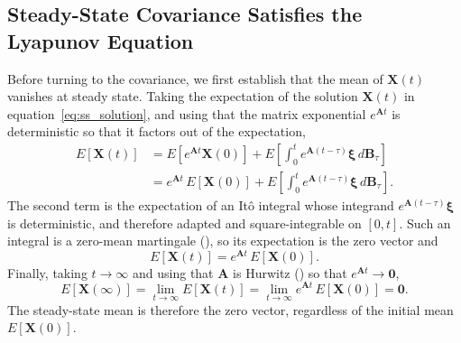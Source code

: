 \documentclass{article}
\begin{document}
\subsection*{Steady-State Covariance Satisfies the Lyapunov Equation}
Before turning to the covariance, we first establish that the mean of
$\mathbf{X}(t)$ vanishes at steady state. Taking the expectation of the solution
$\mathbf{X}(t)$ in equation~\ref{eq:ss_solution}, and using that the matrix
exponential $e^{\mathbf{A}t}$ is deterministic so that it factors out of the
expectation,
\begin{equation}
\begin{aligned}
E[\mathbf{X}(t)]
&= E\left[ e^{\mathbf{A}t}\mathbf{X}(0) \right] + E\left[ \int_0^t e^{\mathbf{A}(t-\tau)} \boldsymbol{\xi}\, d\mathbf{B}_\tau \right] \\
&= e^{\mathbf{A}t}\, E[\mathbf{X}(0)] + E\left[ \int_0^t e^{\mathbf{A}(t-\tau)} \boldsymbol{\xi}\, d\mathbf{B}_\tau \right] .
\end{aligned}
\label{eq:ss_mean_t_0}
\end{equation}
The second term is the expectation of an It\^{o} integral whose integrand
$e^{\mathbf{A}(t-\tau)}\boldsymbol{\xi}$ is deterministic, and therefore adapted and
square-integrable on $[0,t]$. Such an integral is a zero-mean martingale
(\citealp[\S3.2]{Pavliotis2014}), so its
expectation is the zero vector and
\begin{equation}
E[\mathbf{X}(t)] = e^{\mathbf{A}t}\, E[\mathbf{X}(0)] .
\label{eq:ss_mean_t}
\end{equation}
Finally, taking $t\to\infty$ and using that $\mathbf{A}$ is Hurwitz
(\citealp[Theorem~5.1]{AstromMurray2021}) so that $e^{\mathbf{A}t}\to\mathbf{0}$,
\begin{equation}
E[\mathbf{X}(\infty)] = \lim_{t\to\infty} E[\mathbf{X}(t)] = \lim_{t\to\infty} e^{\mathbf{A}t}\, E[\mathbf{X}(0)] = \mathbf{0} .
\label{eq:ss_mean_steady}
\end{equation}
The steady-state mean is therefore the zero vector, regardless of the initial
mean $E[\mathbf{X}(0)]$.
\end{document}
